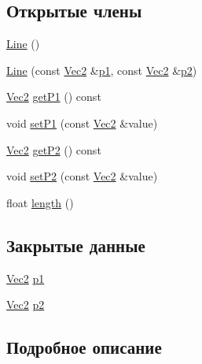 \subsection*{Открытые члены}
\begin{DoxyCompactItemize}
\item 
\hyperlink{class_line_acc11b8a429d8cdd63ba6803dff5602b3}{Line} ()
\item 
\hyperlink{class_line_aef33536da5a03c1d95e4b113a9dc4ccf}{Line} (const \hyperlink{vec2_8h_a056bf34213a36593f50f333d7653fe1c}{Vec2} \&\hyperlink{class_line_a165376d8bc780a0b0ec7ffe8cd0d700a}{p1}, const \hyperlink{vec2_8h_a056bf34213a36593f50f333d7653fe1c}{Vec2} \&\hyperlink{class_line_a21d0f4b2e7252e222e9d32921ea0162c}{p2})
\item 
\hyperlink{vec2_8h_a056bf34213a36593f50f333d7653fe1c}{Vec2} \hyperlink{class_line_aacff829b7404b0f81bd3001d9332b4a7}{get\+P1} () const 
\item 
void \hyperlink{class_line_a238346a97b448ae7d1156c24dff41224}{set\+P1} (const \hyperlink{vec2_8h_a056bf34213a36593f50f333d7653fe1c}{Vec2} \&value)
\item 
\hyperlink{vec2_8h_a056bf34213a36593f50f333d7653fe1c}{Vec2} \hyperlink{class_line_a51b59fb089fd7a02d3f9d1d9a9a132c7}{get\+P2} () const 
\item 
void \hyperlink{class_line_a9be1bb222db100fe5570558a0ab3bb42}{set\+P2} (const \hyperlink{vec2_8h_a056bf34213a36593f50f333d7653fe1c}{Vec2} \&value)
\item 
float \hyperlink{class_line_ae16899b229d209f5fa5d40049937e030}{length} ()
\end{DoxyCompactItemize}
\subsection*{Закрытые данные}
\begin{DoxyCompactItemize}
\item 
\hyperlink{vec2_8h_a056bf34213a36593f50f333d7653fe1c}{Vec2} \hyperlink{class_line_a165376d8bc780a0b0ec7ffe8cd0d700a}{p1}
\item 
\hyperlink{vec2_8h_a056bf34213a36593f50f333d7653fe1c}{Vec2} \hyperlink{class_line_a21d0f4b2e7252e222e9d32921ea0162c}{p2}
\end{DoxyCompactItemize}


\subsection{Подробное описание}


